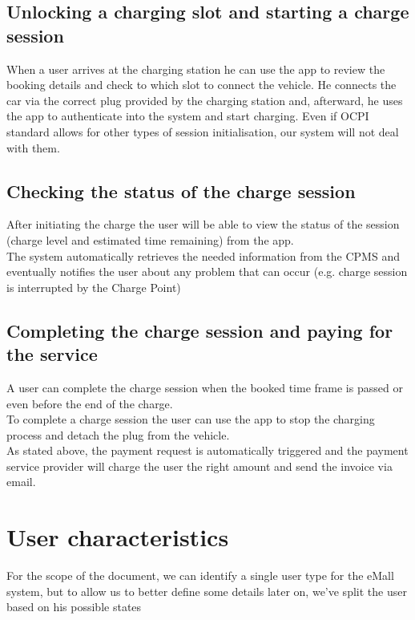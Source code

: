 \subsection{Unlocking a charging slot and starting a charge session}
When a user arrives at the charging station he can use the app to review the booking details and check to which slot to connect the vehicle. He connects the car via the correct plug provided by the charging station and, afterward, he uses the app to authenticate into the system and start charging. Even if OCPI standard allows for other types of session initialisation, our system will not deal with them.

\subsection{Checking the status of the charge session}
After initiating the charge the user will be able to view the status of the session (charge level and estimated time remaining) from the app.\\
The system automatically retrieves the needed information from the CPMS and eventually notifies the user about any problem that can occur (e.g. charge session is interrupted by the Charge Point)

\newpage

\subsection{Completing the charge session and paying for the service}
A user can complete the charge session when the booked time frame is passed or even before the end of the charge.\\
To complete a charge session the user can use the app to stop the charging process and detach the plug from the vehicle.\\
As stated above, the payment request is automatically triggered and the payment service provider will charge the user the right amount and send the invoice via email.

\section{User characteristics}
For the scope of the document, we can identify a single user type for the eMall system, but to allow us to better define some details later on, we've split the user based on his possible states

